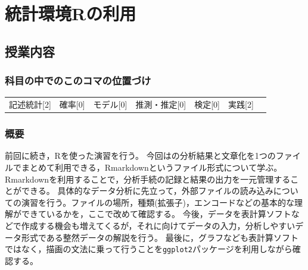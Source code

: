 \section{統計環境Rの利用}
\label{s04_usingR}

\subsection{授業内容}
\subsubsection{科目の中でのこのコマの位置づけ}
\begin{tabular}[t]{ccccccc}
	記述統計[2] & 確率[0] & モデル[0] & 推測・推定[0] & 検定[0] & 実践[2]
\end{tabular}
\subsubsection{概要}
前回に続き，Rを使った演習を行う。
今回はの分析結果と文章化を1つのファイルでまとめて利用できる，Rmarkdownというファイル形式について学ぶ。Rmarkdownを利用することで，分析手続の記録と結果の出力を一元管理することができる。
具体的なデータ分析に先立って，外部ファイルの読み込みについての演習を行う。ファイルの場所，種類(拡張子)，エンコードなどの基本的な理解ができているかを，ここで改めて確認する。
今後，データを表計算ソフトなどで作成する機会も増えてくるが，それに向けてデータの入力，分析しやすいデータ形式である整然データの解説を行う。
最後に，グラフなども表計算ソフトではなく，描画の文法に乗って行うことを\texttt{ggplot2}パッケージを利用しながら確認する。
